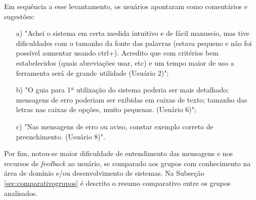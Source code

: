 Em sequência a esse levantamento, os usuários apontaram como comentários e sugestões: 

\begin{enumerate}
    \item [a)] "Achei o sistema em certa medida intuitivo e de fácil manuseio, mas tive dificuldades com o tamanho da fonte das palavras (estava pequeno e não foi possível aumentar usando ctrl+). Acredito que com critérios bem estabelecidos (quais abreviações usar, etc) e um tempo maior de uso a ferramenta será de grande utilidade (Usuário 2)";
    \item[b)] "O guia para 1ª utilização do sistema poderia ser mais detalhado; mensagens de erro poderiam ser exibidas em caixas de texto; tamanho das letras nas caixas de opções, muito pequenas. (Usuário 6)";
    \item[c)] "Nas mensagens de erro ou aviso, constar exemplo correto de preenchimento. (Usuário 8)".   
\end{enumerate}

Por fim, notou-se maior dificuldade de entendimento das mensagens e nos recursos de \textit{feedback} ao usuário, se comparado aos grupos com conhecimento na área de domínio e/ou desenvolvimento de sistemas. Na Subseção \ref{sec:comparativogrupos} é descrito o resumo comparativo entre os grupos analisados.










